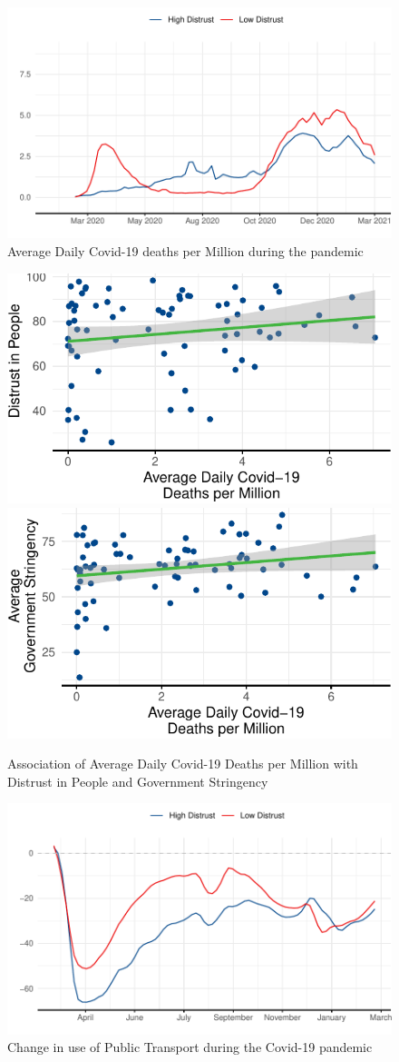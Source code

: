 \documentclass[
  11pt,
]{article}
\begin{document}
\begin{figure}
\includegraphics[width=0.8\linewidth]{write_up_test_files/figure-latex/deaths-change-1} \caption{Average Daily Covid-19 deaths per Million during the pandemic}\label{fig:deaths-change}
\end{figure}

\begin{figure}
\includegraphics[width=0.48\linewidth]{write_up_test_files/figure-latex/deaths-plots-1} \includegraphics[width=0.48\linewidth]{write_up_test_files/figure-latex/deaths-plots-2} \caption{Association of Average Daily Covid-19 Deaths per Million with Distrust in People and Government Stringency}\label{fig:deaths-plots}
\end{figure}

\begin{figure}
\includegraphics[width=0.8\linewidth]{write_up_test_files/figure-latex/mobility-plot-1} \caption{Change in use of Public Transport during the Covid-19 pandemic}\label{fig:mobility-plot}
\end{figure}
\end{document}
